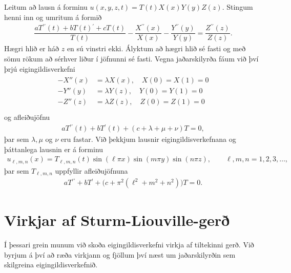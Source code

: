 \documentclass[a4paper,10pt,icelandic]{sphinxmanual}
\begin{document}
Leitum að lausn á forminu
\(u(x,y,z,t)=T(t)X(x)Y(y)Z(z)\). Stingum henni inn og umritum á formið
\begin{equation*}
\begin{split}\dfrac{aT{{^{\prime\prime}}}(t)+bT(t){{^{\prime}}}+cT(t)}{T(t)}-
 \dfrac{X{{^{\prime\prime}}}(x)}{X(x)}-\dfrac{Y{{^{\prime\prime}}}(y)}{Y(y)}=\dfrac{Z{{^{\prime\prime}}}(z)}{Z(z)}.\end{split}
\end{equation*}
Hægri hlið er háð \(z\) en sú vinstri ekki. Ályktum að hægri hlið sé fasti og með sömu rökum að sérhver liður í jöfnunni sé fasti. Vegna jaðarskilyrða fáum við því þrjú eigingildisverkefni
\begin{equation*}
\begin{split}\begin {align*}
-X''(x) &= \lambda X(x),\quad X(0) = X(1) = 0 \\
-Y''(y) &= \lambda Y(z),\quad Y(0) = Y(1) = 0 \\
-Z''(z) &= \lambda Z(z),\quad Z(0) = Z(1) = 0 \\
\end{align*}\end{split}
\end{equation*}
og afleiðujöfnu
\begin{equation*}
\begin{split}aT{{^{\prime\prime}}}(t)+bT{{^{\prime}}}(t)+(c+\lambda+\mu+\nu)T=0,\end{split}
\end{equation*}
þar sem \(\lambda, \mu\) og \(\nu\) eru fastar. Við þekkjum lausnir eigingildisverkefnana og þáttanlega lausnin er á forminu
\begin{equation*}
\begin{split}u_{\ell,m,n}(x) = T_{\ell, m, n}(t) \sin (\ell \pi x) \sin (m\pi y) \sin
(n\pi z), \qquad \ell, m, n=1,2,3,\dots,\end{split}
\end{equation*}
þar sem \(T_{\ell, m,n}\) uppfyllir afleiðujöfnuna
\begin{equation*}
\begin{split}aT{{^{\prime\prime}}}+ bT{{^{\prime}}}+\big(c+\pi^2(\ell^2+m^2+n^2)\big)T=0.\end{split}
\end{equation*}

\section{Virkjar af Sturm-Liouville-gerð}
\label{\detokenize{Kafli03:virkjar-af-sturm-liouville-ger}}
Í þessari grein munum við skoða eigingildisverkefni virkja af tiltekinni gerð. Við byrjum á því að ræða virkjann og fjöllum því næst um jaðarskilyrðin sem skilgreina eigingildisverkefnið.
\end{document}
